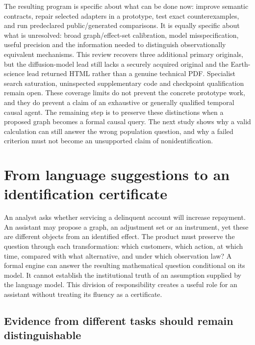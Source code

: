 The resulting program is specific about what can be done now: improve
semantic contracts, repair selected adapters in a prototype, test exact
counterexamples, and run predeclared public/generated comparisons. It is
equally specific about what is unresolved: broad graph/effect-set
calibration, model misspecification, useful precision and the information
needed to distinguish observationally equivalent mechanisms. This review
recovers three additional primary originals, but the diffusion-model lead
still lacks a securely acquired original and the Earth-science lead returned
HTML rather than a genuine technical PDF. Specialist search saturation,
uninspected supplementary code and checkpoint qualification remain open.
These coverage limits do not prevent the concrete prototype work, and they
do prevent a claim of an exhaustive or generally qualified temporal causal
agent.
\citep{exec15_latent_design}
The remaining step is to preserve these distinctions when a proposed graph
becomes a formal causal query. The next study shows why a valid calculation
can still answer the wrong population question, and why a failed criterion
must not become an unsupported claim of nonidentification.
\label{exec15:latent-temporal-end}


\section{From language suggestions to an identification certificate}
\label{exec14:llm-identification}

An analyst asks whether servicing a delinquent account will increase repayment.
An assistant may propose a graph, an adjustment set or an instrument, yet these
are different objects from an identified effect. The product must preserve the
question through each transformation: which customers, which action, at which
time, compared with what alternative, and under which observation law? A formal
engine can answer the resulting mathematical question conditional on its model.
It cannot establish the institutional truth of an assumption supplied by the
language model. This division of responsibility creates a useful role for an
assistant without treating its fluency as a certificate. \citep{exec14_ident_contract}

\subsection{Evidence from different tasks should remain distinguishable}

